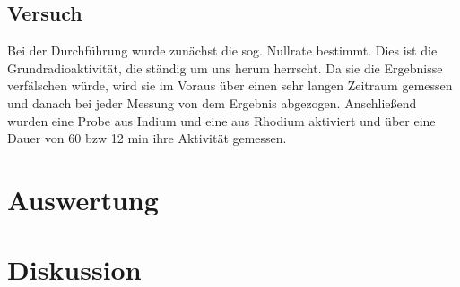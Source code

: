 	\subsection{Versuch}
Bei der Durchführung wurde zunächst die sog. Nullrate bestimmt. Dies ist die Grundradioaktivität, die ständig um uns herum herrscht. Da sie die Ergebnisse verfälschen würde, wird sie im Voraus über einen sehr langen Zeitraum gemessen und danach bei jeder Messung von dem Ergebnis abgezogen.
Anschließend wurden eine Probe aus Indium und eine aus Rhodium aktiviert und über eine Dauer von 60 bzw 12 min ihre Aktivität gemessen.

	\section{Auswertung}

	\section{Diskussion}






